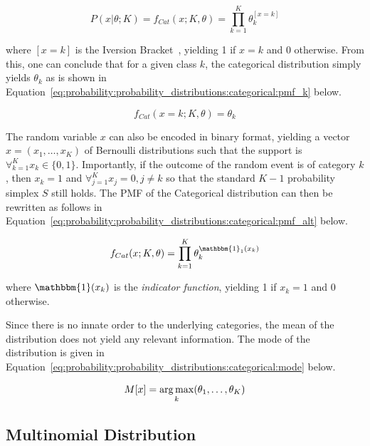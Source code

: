 \begin{equation}
      \label{eq:probability:probability_distributions:categorical:pmf}
      P(x \vert \theta; K) = f_{Cat}(x; K, \theta) = \prod_{k=1}^{K}\theta_{k}^{[x = k]}
\end{equation}

where $[x = k]$ is the Iversion Bracket~\cite{ref:iverson:1962}, yielding 1 if $x = k$ and 0 otherwise. From this, one can conclude that for a given class $k$, the categorical distribution simply yields $\theta_{k}$ as is shown in Equation~\eqref{eq:probability:probability_distributions:categorical:pmf_k} below.

\begin{equation}
      \label{eq:probability:probability_distributions:categorical:pmf_k}
      f_{Cat}(x=k; K, \theta) = \theta_{k}
\end{equation}

The random variable $x$ can also be encoded in binary format, yielding a vector $x = (x_{1}, \dots, x_{K})$ of Bernoulli distributions such that the support is $\forall_{k=1}^{K} x_{k} \in \{0, 1\}$. Importantly, if the outcome of the random event is of category $k$, then $x_{k} = 1$ and $\forall_{j=1}^{K} x_{j} = 0, j \neq k$ so that the standard $K-1$ probability simplex $S$ still holds. The \ac{PMF} of the Categorical distribution can then be rewritten as follows in Equation~\eqref{eq:probability:probability_distributions:categorical:pmf_alt} below.

\begin{equation}
      \label{eq:probability:probability_distributions:categorical:pmf_alt}
      f_{Cat}(x; K, \theta) = \prod_{k=1}^{K}\theta_{k}^{\mathbbm{1}_{1}(x_{k})}
\end{equation}

where $\mathbbm{1}(x_{k})$ is the \textit{indicator function}, yielding 1 if $x_{k} = 1$ and 0 otherwise.

Since there is no innate order to the underlying categories, the mean of the distribution does not yield any relevant information. The mode of the distribution is given in Equation~\eqref{eq:probability:probability_distributions:categorical:mode} below.

\begin{equation}
      \label{eq:probability:probability_distributions:categorical:mode}
      M[x] = \operatorname*{arg\,max}_{k}(\theta_{1}, \dots, \theta_{K})
\end{equation}


\subsection{Multinomial Distribution}
\label{sec:probability:probability_distributions:multinomial}

